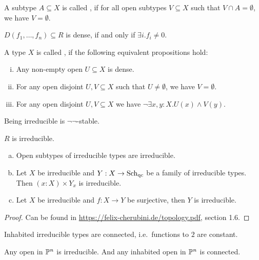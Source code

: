 \begin{definition}
  A subtype $A\subseteq X$ is called ,
  if for all open subtypes $V\subseteq X$ such that $V\cap A=\emptyset$, we have $V=\emptyset$.
\end{definition}

\begin{remark}
  \(D(f_1,\dots,f_n)\subseteq R\) is dense, if and only if \(\exists i. f_i\neq 0\).
\end{remark}

\begin{definition}%
  \label{irred}
  A type $X$ is called ,
  if the following equivalent propositions hold:
  \begin{enumerate}[(i)]
  \item Any non-empty open $U\subseteq X$ is dense.
  \item For any open disjoint $U,V\subseteq X$ such that $U\neq\emptyset$, we have $V=\emptyset$.
  \item For any open disjoint $U,V\subseteq X$ we have $\neg\exists x,y:X. U(x)\wedge V(y)$.
  \end{enumerate}
\end{definition}

Being irreducible is \(\neg\neg\)-stable.

\begin{remark}
  \label{R-irreducible}
  $R$ is irreducible.
\end{remark}

\begin{lemma}
  \begin{enumerate}[(a)]
  \item Open subtypes of irreducible types are irreducible.
  \item Let $X$ be irreducible and $Y:X\to\operatorname{\mathrm{Sch}_{qc}}$ be a family of irreducible types.
  Then $(x:X) \times Y_x$ is irreducible.
  \item Let $X$ be irreducible and $f:X\to Y$ be surjective,
  then $Y$ is irreducible.
  \end{enumerate}
\end{lemma}

\begin{proof}
  Can be found in \href{https://felix-cherubini.de/topology.pdf}{https://felix-cherubini.de/topology.pdf}, section 1.6.
\end{proof}

\begin{remark}
  Inhabited irreducible types are connected, i.e.\ functions to \(2\) are constant.
\end{remark}

\begin{remark}
  Any open in \(\mathbb{P}^n\) is irreducible.
  And any inhabited open in \(\mathbb{P}^n\) is connected.
\end{remark}


